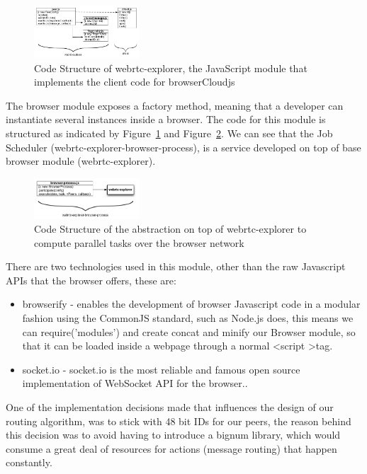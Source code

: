 \begin{figure}[h!]
  \centering
  \includegraphics[width=0.35\textwidth]{figs/diagram-webrtc-explorer}
  \caption{Code Structure of webrtc-explorer, the JavaScript module that implements the client code for browserCloudjs}
  \label{fig:d-w-e}
\end{figure}

The browser module exposes a factory method, meaning that a developer can instantiate several instances inside a browser. The code for this module is structured as indicated by Figure~\ref{fig:d-w-e} and Figure~\ref{fig:d-w-e-b-p}. We can see that the Job Scheduler (webrtc-explorer-browser-process), is a service developed on top of base browser module (webrtc-explorer).

\begin{figure}[h!]
  \centering
  \includegraphics[width=0.35\textwidth]{figs/diagram-webrtc-explorer-browser-process}
  \caption{Code Structure of the abstraction on top of webrtc-explorer to compute parallel tasks over the browser network}
  \label{fig:d-w-e-b-p}
\end{figure}

There are two technologies used in this module, other than the raw Javascript APIs that the browser offers, these are:

\begin{itemize}
    \item browserify - enables the development of browser Javascript code in a modular fashion using the CommonJS standard, such as Node.js does, this means we can require('modules') and create concat and minify our Browser module, so that it can be loaded inside a webpage through a normal \textless script \textgreater tag.
    \item socket.io - socket.io is the most reliable and famous open source implementation of WebSocket API for the browser..
\end{itemize}

One of the implementation decisions made that influences the design of our routing algorithm, was to stick with 48 bit IDs for our peers, the reason behind this decision was to avoid having to introduce a bignum library, which would consume a great deal of resources for actions (message routing) that happen constantly.

